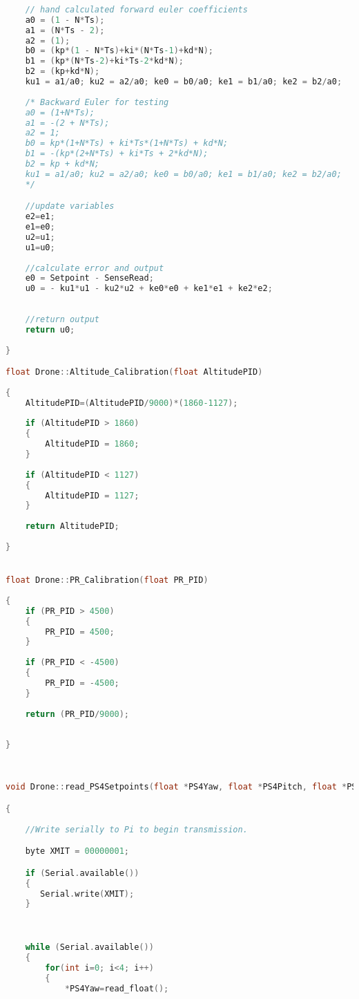 \begin{lstlisting}[language=C,caption={Drone.cpp Arduino Library File},label={lst:Drone.cpp}]
    
    // hand calculated forward euler coefficients
    a0 = (1 - N*Ts);
    a1 = (N*Ts - 2);
    a2 = (1);
    b0 = (kp*(1 - N*Ts)+ki*(N*Ts-1)+kd*N);
    b1 = (kp*(N*Ts-2)+ki*Ts-2*kd*N);
    b2 = (kp+kd*N);
    ku1 = a1/a0; ku2 = a2/a0; ke0 = b0/a0; ke1 = b1/a0; ke2 = b2/a0;
    
    /* Backward Euler for testing
    a0 = (1+N*Ts);    
    a1 = -(2 + N*Ts);
    a2 = 1;
    b0 = kp*(1+N*Ts) + ki*Ts*(1+N*Ts) + kd*N;
    b1 = -(kp*(2+N*Ts) + ki*Ts + 2*kd*N);
    b2 = kp + kd*N;
    ku1 = a1/a0; ku2 = a2/a0; ke0 = b0/a0; ke1 = b1/a0; ke2 = b2/a0;
    */

    //update variables
    e2=e1;
    e1=e0;
    u2=u1;
    u1=u0;
    
    //calculate error and output
    e0 = Setpoint - SenseRead;
    u0 = - ku1*u1 - ku2*u2 + ke0*e0 + ke1*e1 + ke2*e2;
    
    
    //return output
    return u0;
    
}

float Drone::Altitude_Calibration(float AltitudePID)
    
{
    AltitudePID=(AltitudePID/9000)*(1860-1127);
    
    if (AltitudePID > 1860)
    {
        AltitudePID = 1860; 
    }
    
    if (AltitudePID < 1127)
    {
        AltitudePID = 1127;
    }
    
    return AltitudePID;
 
}


float Drone::PR_Calibration(float PR_PID)
    
{
    if (PR_PID > 4500)
    {
        PR_PID = 4500;  
    }
    
    if (PR_PID < -4500)
    {
        PR_PID = -4500;
    }
    
    return (PR_PID/9000);
    
    
}
    
    

void Drone::read_PS4Setpoints(float *PS4Yaw, float *PS4Pitch, float *PS4Roll, float *PS4Altitude)

{
    
    //Write serially to Pi to begin transmission.

    byte XMIT = 00000001;

    if (Serial.available())
    {
       Serial.write(XMIT);
    }


    
    while (Serial.available())
    {
        for(int i=0; i<4; i++)
        {
            *PS4Yaw=read_float();
        

\end{lstlisting}
